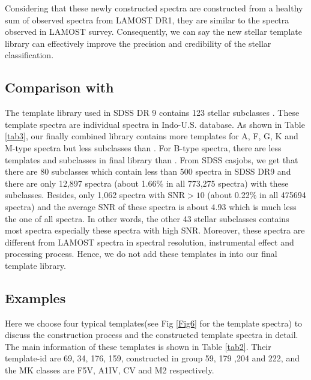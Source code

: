 \documentclass[manuscript]{aastex}
\begin{document}
Considering that these newly constructed spectra are constructed from  a healthy sum of observed spectra from  LAMOST DR1,
they are  similar to the spectra observed in LAMOST survey.
Consequently, we can say the new stellar template library can effectively improve the precision  and credibility  of the stellar classification.

\subsection{Comparison with  \citet{bolton2012spectral}}

The template library used in SDSS DR 9 contains  123 stellar subclasses \citep{bolton2012spectral}.
These template spectra  are individual spectra in  Indo-U.S. database.
As shown in Table \ref{tab3},
our finally combined library contains more templates for A, F, G, K and M-type spectra
but less subclasses than \citet{bolton2012spectral}.
For B-type spectra, there are less templates and subclasses in final library than \citet{bolton2012spectral}.
From SDSS casjobs,
we get that there are 80 subclasses which contain less than 500 spectra in SDSS DR9
and  there are only 12,897 spectra (about 1.66\% in all 773,275 spectra) with these subclasses.
Besides, only 1,062 spectra  with SNR$>10$ (about 0.22\% in all 475694 spectra) and
the average SNR of these spectra is about 4.93 which is much less the one of all spectra.
In other words, the other 43 stellar subclasses contains most spectra especially these spectra with high SNR.
Moreover, these spectra are different from LAMOST spectra in spectral resolution, instrumental effect and processing process.
Hence, we do not add these templates in  \citet{bolton2012spectral} into our final template library.




\subsection{Examples}
Here we choose four typical templates(see Fig \ref{Fig6} for the template spectra)  to  discuss the construction process and the constructed template spectra in detail.
The main information of these templates is shown in Table \ref{tab2}.
Their template-id are 69, 34, 176, 159,
constructed in group 59, 179 ,204 and 222, and
the MK classes are F5V, A1IV, CV and M2 respectively.
\end{document}
